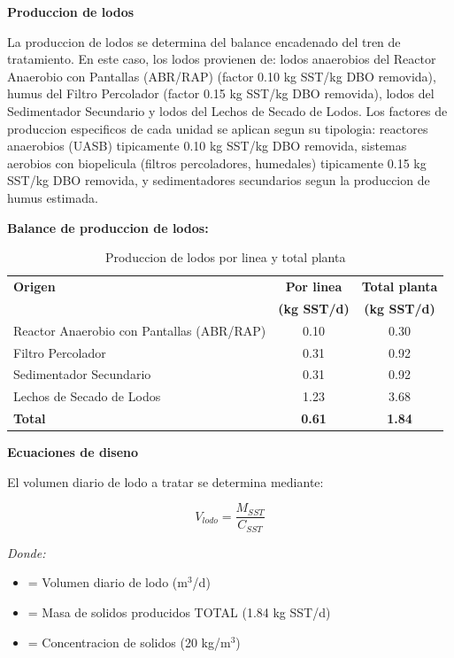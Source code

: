 \documentclass[12pt,a4paper]{article}
\begin{document}
\textbf{Produccion de lodos}

La produccion de lodos se determina del balance encadenado del tren de tratamiento. En este caso, los lodos provienen de: lodos anaerobios del Reactor Anaerobio con Pantallas (ABR/RAP) (factor 0.10 kg SST/kg DBO removida), humus del Filtro Percolador (factor 0.15 kg SST/kg DBO removida), lodos del Sedimentador Secundario y lodos del Lechos de Secado de Lodos. Los factores de produccion especificos de cada unidad se aplican segun su tipologia: reactores anaerobios (UASB) tipicamente 0.10 kg SST/kg DBO removida, sistemas aerobios con biopelicula (filtros percoladores, humedales) tipicamente 0.15 kg SST/kg DBO removida, y sedimentadores secundarios segun la produccion de humus estimada.

\textbf{Balance de produccion de lodos:}

\begin{table}[H]
\centering
\small
\caption{Produccion de lodos por linea y total planta}
\begin{tabular}{p{6cm}cc}
\toprule
\textbf{Origen} & \textbf{Por linea} & \textbf{Total planta} \\
 & \textbf{(kg SST/d)} & \textbf{(kg SST/d)} \\
\midrule
Reactor Anaerobio con Pantallas (ABR/RAP) & 0.10 & 0.30 \\
Filtro Percolador & 0.31 & 0.92 \\
Sedimentador Secundario & 0.31 & 0.92 \\
Lechos de Secado de Lodos & 1.23 & 3.68 \\
\midrule
\textbf{Total} & \textbf{0.61} & \textbf{1.84} \\
\bottomrule
\end{tabular}
\end{table}

\textbf{Ecuaciones de diseno}

El volumen diario de lodo a tratar se determina mediante:

\begin{equation}
V_{lodo} = \frac{M_{SST}}{C_{SST}}
\end{equation}

\textit{Donde:}
\begin{itemize}[noitemsep,leftmargin=2em]
    \item[$V_{lodo}$] = Volumen diario de lodo (m$^3$/d)
    \item[$M_{SST}$] = Masa de solidos producidos TOTAL (1.84 kg SST/d)
    \item[$C_{SST}$] = Concentracion de solidos (20 kg/m$^3$)
\end{itemize}
\end{document}
